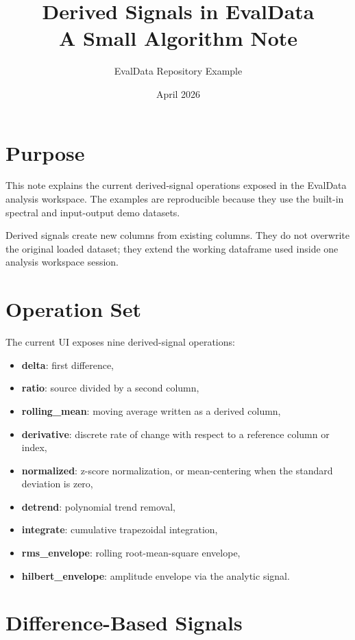 \documentclass[11pt,a4paper]{article}
\title{Derived Signals in EvalData\\A Small Algorithm Note}
\author{EvalData Repository Example}
\date{April 2026}
\begin{document}
\maketitle

\section{Purpose}

This note explains the current derived-signal operations exposed in the EvalData analysis workspace. The examples are reproducible because they use the built-in spectral and input-output demo datasets.

Derived signals create new columns from existing columns. They do not overwrite the original loaded dataset; they extend the working dataframe used inside one analysis workspace session.

\section{Operation Set}

The current UI exposes nine derived-signal operations:

\begin{itemize}
    \item \textbf{delta}: first difference,
    \item \textbf{ratio}: source divided by a second column,
    \item \textbf{rolling\_mean}: moving average written as a derived column,
    \item \textbf{derivative}: discrete rate of change with respect to a reference column or index,
    \item \textbf{normalized}: z-score normalization, or mean-centering when the standard deviation is zero,
    \item \textbf{detrend}: polynomial trend removal,
    \item \textbf{integrate}: cumulative trapezoidal integration,
    \item \textbf{rms\_envelope}: rolling root-mean-square envelope,
    \item \textbf{hilbert\_envelope}: amplitude envelope via the analytic signal.
\end{itemize}

\section{Difference-Based Signals}
\end{document}
